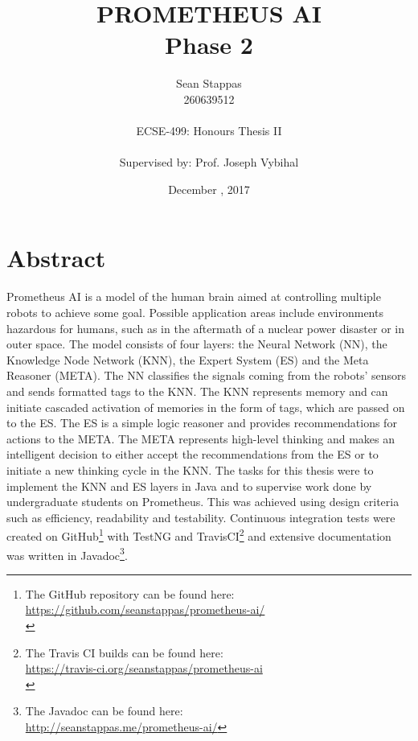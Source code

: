 \documentclass[titlepage,11pt]{article}
\title
{
	\uppercase{Prometheus AI} \\
	\large Phase 2
}
\author %
{
	Sean Stappas \\ 
	260639512 \\
	\\ 
	ECSE-499: Honours Thesis II \\
	\\
	\small Supervised by: Prof. Joseph Vybihal
}
\date{December \nth{7}, 2017}
\begin{document}
	
\sloppy

\maketitle

\section*{Abstract}
Prometheus AI is a model of the human brain aimed at controlling multiple robots to achieve some goal. Possible application areas include environments hazardous for humans, such as in the aftermath of a nuclear power disaster or in outer space. The model consists of four layers: the Neural Network (NN), the Knowledge Node Network (KNN), the Expert System (ES) and the Meta Reasoner (META). The NN classifies the signals coming from the robots' sensors and sends formatted tags to the KNN. The KNN represents memory and can initiate cascaded activation of memories in the form of tags, which are passed on to the ES. The ES is a simple logic reasoner and provides recommendations for actions to the META. The META represents high-level thinking and makes an intelligent decision to either accept the recommendations from the ES or to initiate a new thinking cycle in the KNN. The tasks for this thesis were to implement the KNN and ES layers in Java and to supervise work done by undergraduate students on Prometheus. This was achieved using design criteria such as efficiency, readability and testability. Continuous integration tests were created on GitHub\footnote{The GitHub repository can be found here:\\ \url{https://github.com/seanstappas/prometheus-ai/}\\} with TestNG and TravisCI\footnote{The Travis CI builds can be found here:\\ \url{https://travis-ci.org/seanstappas/prometheus-ai}\\} and extensive documentation was written in Javadoc\footnote{The Javadoc can be found here:\\ \url{http://seanstappas.me/prometheus-ai/}}.
\end{document}
